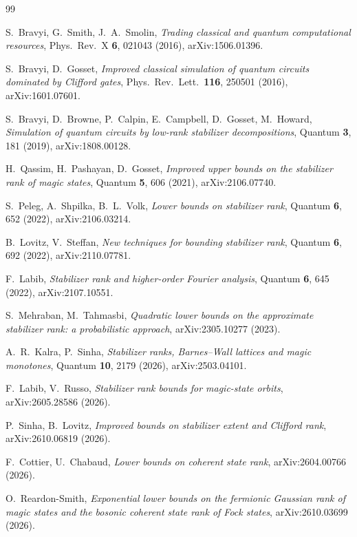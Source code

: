 \begin{thebibliography}{99}\small

 S.~Bravyi, G.~Smith, J.~A.~Smolin, \emph{Trading classical and quantum computational resources}, Phys.\ Rev.\ X \textbf{6}, 021043 (2016), arXiv:1506.01396.

 S.~Bravyi, D.~Gosset, \emph{Improved classical simulation of quantum circuits dominated by Clifford gates}, Phys.\ Rev.\ Lett.\ \textbf{116}, 250501 (2016), arXiv:1601.07601.

 S.~Bravyi, D.~Browne, P.~Calpin, E.~Campbell, D.~Gosset, M.~Howard, \emph{Simulation of quantum circuits by low-rank stabilizer decompositions}, Quantum \textbf{3}, 181 (2019), arXiv:1808.00128.

 H.~Qassim, H.~Pashayan, D.~Gosset, \emph{Improved upper bounds on the stabilizer rank of magic states}, Quantum \textbf{5}, 606 (2021), arXiv:2106.07740.

 S.~Peleg, A.~Shpilka, B.~L.~Volk, \emph{Lower bounds on stabilizer rank}, Quantum \textbf{6}, 652 (2022), arXiv:2106.03214.

 B.~Lovitz, V.~Steffan, \emph{New techniques for bounding stabilizer rank}, Quantum \textbf{6}, 692 (2022), arXiv:2110.07781.

 F.~Labib, \emph{Stabilizer rank and higher-order Fourier analysis}, Quantum \textbf{6}, 645 (2022), arXiv:2107.10551.

 S.~Mehraban, M.~Tahmasbi, \emph{Quadratic lower bounds on the approximate stabilizer rank: a probabilistic approach}, arXiv:2305.10277 (2023).

 A.~R.~Kalra, P.~Sinha, \emph{Stabilizer ranks, Barnes--Wall lattices and magic monotones}, Quantum \textbf{10}, 2179 (2026), arXiv:2503.04101.

 F.~Labib, V.~Russo, \emph{Stabilizer rank bounds for magic-state orbits}, arXiv:2605.28586 (2026).

 P.~Sinha, B.~Lovitz, \emph{Improved bounds on stabilizer extent and Clifford rank}, arXiv:2610.06819 (2026).

 F.~Cottier, U.~Chabaud, \emph{Lower bounds on coherent state rank}, arXiv:2604.00766 (2026).

 O.~Reardon-Smith, \emph{Exponential lower bounds on the fermionic Gaussian rank of magic states and the bosonic coherent state rank of Fock states}, arXiv:2610.03699 (2026).


\end{thebibliography}
